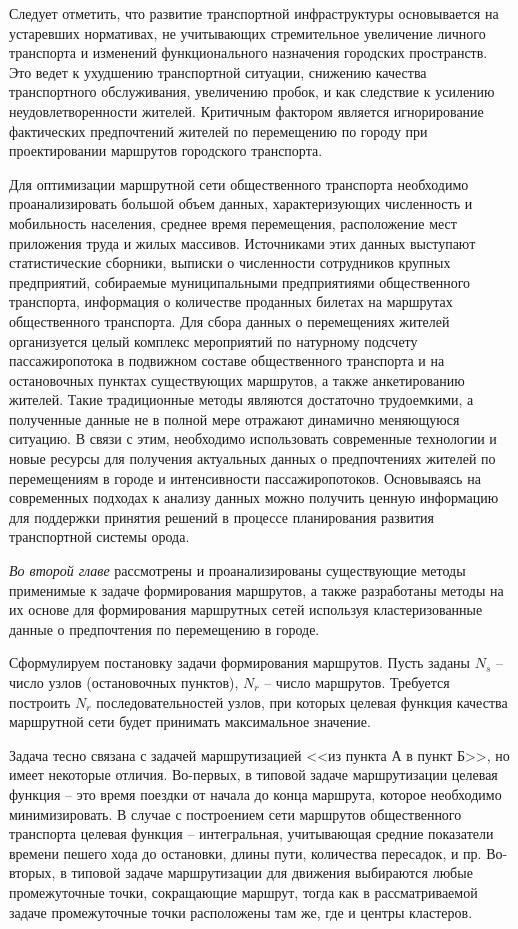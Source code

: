 Следует отметить, что развитие транспортной инфраструктуры основывается на устаревших нормативах, не 
учитывающих стремительное увеличение личного транспорта и изменений функционального назначения городских 
пространств. Это ведет к ухудшению транспортной ситуации, снижению качества транспортного обслуживания, 
увеличению пробок, и как следствие к усилению неудовлетворенности жителей. Критичным фактором является 
игнорирование фактических предпочтений жителей по перемещению по городу при проектировании маршрутов 
городского транспорта.

Для оптимизации маршрутной сети общественного транспорта необходимо проанализировать большой объем данных, 
характеризующих численность и мобильность населения, среднее время перемещения, расположение мест приложения 
труда и жилых массивов. Источниками этих данных выступают статистические сборники, выписки о численности 
сотрудников крупных предприятий, собираемые муниципальными предприятиями общественного транспорта, 
информация о количестве проданных билетах на маршрутах общественного транспорта. Для сбора данных о 
перемещениях жителей организуется целый комплекс мероприятий по натурному подсчету пассажиропотока в 
подвижном составе общественного транспорта и на остановочных пунктах существующих маршрутов, а также 
анкетированию жителей. Такие традиционные методы являются достаточно трудоемкими, а полученные данные не в 
полной мере отражают динамично меняющуюся ситуацию. В связи с этим, необходимо использовать современные 
технологии и новые ресурсы для получения актуальных данных о предпочтениях жителей по перемещениям в городе 
и интенсивности пассажиропотоков. Основываясь на современных подходах к анализу данных можно получить 
ценную информацию для поддержки принятия решений в процессе планирования развития транспортной системы 
орода.

\emph{Во второй главе} рассмотрены и проанализированы существующие методы применимые к задаче формирования 
маршрутов, а также разработаны методы на их основе для формирования маршрутных сетей используя 
кластеризованные данные о предпочтения по перемещению в городе.

Сформулируем постановку задачи формирования маршрутов. Пусть заданы \( N_s \) – число узлов (остановочных 
пунктов), \( N_r \) – число маршрутов. Требуется построить \( N_r \) последовательностей узлов, при которых 
целевая функция качества маршрутной сети будет принимать максимальное значение. 

Задача тесно связана с задачей маршрутизацией <<из пункта А в пункт Б>>, но имеет некоторые отличия. 
Во-первых, в типовой задаче маршрутизации целевая функция – это время поездки от начала до конца маршрута, 
которое необходимо минимизировать. В случае с построением сети маршрутов общественного транспорта целевая 
функция -- интегральная, учитывающая средние показатели времени пешего хода до остановки, длины пути, 
количества пересадок, и пр. Во-вторых, в типовой задаче маршрутизации для движения выбираются любые 
промежуточные точки, сокращающие маршрут, тогда как в рассматриваемой задаче промежуточные точки 
расположены там же, где и центры кластеров.

